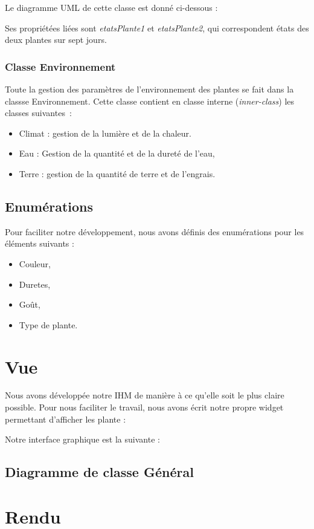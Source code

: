 \documentclass[a4paper,10pt]{article}
\begin{document}
Le diagramme UML de cette classe est donné ci-dessous :

Ses propriétées liées sont \textit{etatsPlante1} et \textit{etatsPlante2}, qui correspondent états des deux plantes
sur sept jours.


\subsubsection{Classe Environnement}
Toute la gestion des paramètres de l'environnement des plantes se fait dans la classse Environnement.
Cette classe contient en classe interne (\textit{inner-class}) les classes suivantes~:
\begin{itemize}
	\item Climat : gestion de la lumière et de la chaleur.
	\item Eau : Gestion de la quantité et de la dureté de l'eau,
	\item Terre : gestion de la quantité de terre et de l'engrais.
\end{itemize}

\subsection{Enumérations}

Pour faciliter notre développement, nous avons définis des enumérations pour les éléments suivants :
\begin{itemize}
 \item Couleur,
 \item Duretes,
 \item Goût,
 \item Type de plante.
\end{itemize}


\section{Vue}

Nous avons développée notre IHM de manière à ce qu'elle soit le plus claire possible.
Pour nous faciliter le travail, nous avons écrit notre propre widget permettant d'afficher les plante :

Notre interface graphique est la suivante :
\subsection{Diagramme de classe Général}
\section{Rendu}
\end{document}
